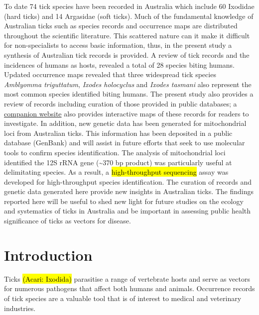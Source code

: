 \documentclass[a4paper, nobind]{templates/ociamthesis}
\begin{document}
To date 74 tick species have been recorded in Australia which include 60 Ixodidae (hard ticks) and 14 Argasidae (soft ticks).
Much of the fundamental knowledge of Australian ticks such as species records and occurrence maps are distributed throughout the scientific literature.
This scattered nature can it make it difficult for non-specialists to access basic information, thus, in the present study a synthesis of Australian tick records is provided.
A review of tick records and the incidences of humans as hosts, revealed a total of 28 species biting humans.
Updated occurrence maps revealed that three widespread tick species \emph{Amblyomma triguttatum}, \emph{Ixodes holocyclus} and \emph{Ixodes tasmani} also represent the most common species identified biting humans.
The present study also provides a review of records including curation of those provided in public databases; a \href{https://siobhonlegan.com/wildlife-ticks/}{companion website} also provides interactive maps of these records for readers to investigate.
In addition, new genetic data has been generated for mitochondrial loci from Australian ticks.
This information has been deposited in a public database (GenBank) and will assist in future efforts that seek to use molecular tools to confirm species identification.
The analysis of mitochondrial loci identified the 12S rRNA gene (\textasciitilde370 bp product) was particularly useful at delimitating species.
As a result, a \hl{high-throughput sequencing} assay was developed for high-throughput species identification.
The curation of records and genetic data generated here provide new insights in Australian ticks.
The findings reported here will be useful to shed new light for future studies on the ecology and systematics of ticks in Australia and be important in assessing public health significance of ticks as vectors for disease.

\hypertarget{introduction}{%
\section{Introduction}\label{introduction}}

Ticks \hl{(Acari: Ixodida)} parasitise a range of vertebrate hosts and serve as vectors for numerous pathogens that affect both humans and animals.
Occurrence records of tick species are a valuable tool that is of interest to medical and veterinary industries.
\end{document}
